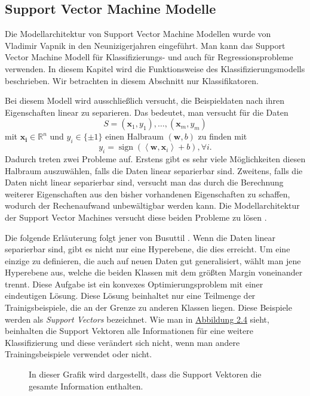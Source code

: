 \subsection{Support Vector Machine Modelle}

Die Modellarchitektur von Support Vector Machine Modellen wurde von Vladimir Vapnik \cite{SVMVapnik} in den Neunizigerjahren eingef\"uhrt. Man kann das
Support Vector Machine Modell f\"ur Klassifizierungs- und auch f\"ur Regressionsprobleme verwenden. In diesem Kapitel wird die Funktionsweise des Klassifizierungsmodells
beschrieben. Wir betrachten in diesem Abschnitt nur Klassifikatoren.

Bei diesem Modell wird ausschlie{\ss}lich versucht, die Beispieldaten nach ihren Eigenschaften linear zu separieren. Das bedeutet, man versucht f\"ur die
Daten 
$$S = (\mathbf{x}_1,y_1),\dots, (\mathbf{x}_m, y_m)$$
 mit $\mathbf{x_i} \in \mathbb{R}^n$ und $y_i \in \{\pm1\}$ einen Halbraum $(\mathbf{w},b)$ zu finden
mit 
$$y_i = \operatorname{sign}(\left\langle \mathbf{w},\mathbf{x}_i\right\rangle + b), \forall i.$$ 
Dadurch treten zwei Probleme auf. Erstens gibt es sehr viele M\"oglichkeiten diesen Halbraum auszuw\"ahlen, falls die Daten linear separierbar sind. 
Zweitens, falls die Daten nicht linear separierbar sind, versucht man das durch die Berechnung
weiterer Eigenschaften aus den bisher vorhandenen Eigenschaften zu schaffen, wodurch der Rechenaufwand unbew\"altigbar werden kann. Die Modellarchitektur der Support Vector Machines versucht
diese beiden Probleme zu l\"osen \cite[Kapitel 15]{shalev}.

Die folgende Erl\"auterung folgt jener von Busuttil \cite{SVM1}. Wenn die Daten linear separierbar sind, gibt es nicht nur eine Hyperebene, die dies erreicht.
Um eine einzige zu definieren, die auch auf neuen Daten gut generalisiert, w\"ahlt man jene Hyperebene aus, welche die beiden Klassen mit dem gr\"o{\ss}ten Margin
voneinander trennt. Diese Aufgabe ist ein konvexes Optimierungsproblem mit einer eindeutigen L\"osung. Diese L\"osung beinhaltet nur eine Teilmenge der Trainigsbeispiele, die
an der Grenze zu anderen Klassen liegen. Diese Beispiele werden als \textit{Support Vectors} bezeichnet. Wie man in \hyperref[fig:svm2]{Abbildung 2.4} sieht, beinhalten die Support Vektoren
alle Informationen f\"ur eine weitere Klassifizierung und diese ver\"andert sich nicht, wenn man andere Trainingsbeispiele verwendet oder nicht.

\begin{figure}[ht]
	\label{fig:svm1}
	\begin{center}
		\begin{tiny}
		\end{tiny}
	\end{center}
	\caption[Darstellung der Support Vektoren]
	{In dieser Grafik wird dargestellt, dass die Support Vektoren die gesamte Information enthalten.}
\end{figure}



